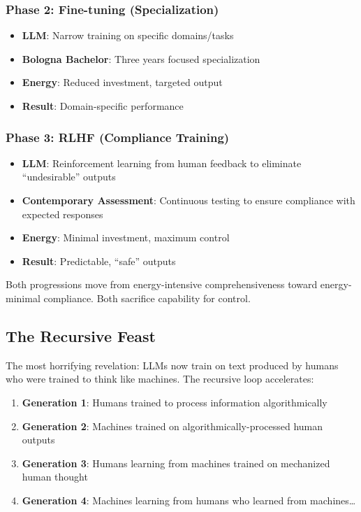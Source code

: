 \subsubsection{Phase 2: Fine-tuning (Specialization)}
\begin{itemize}
\item \textbf{LLM}: Narrow training on specific domains/tasks
\item \textbf{Bologna Bachelor}: Three years focused specialization
\item \textbf{Energy}: Reduced investment, targeted output
\item \textbf{Result}: Domain-specific performance
\end{itemize}

\subsubsection{Phase 3: RLHF (Compliance Training)}
\begin{itemize}
\item \textbf{LLM}: Reinforcement learning from human feedback to eliminate ``undesirable'' outputs
\item \textbf{Contemporary Assessment}: Continuous testing to ensure compliance with expected responses
\item \textbf{Energy}: Minimal investment, maximum control
\item \textbf{Result}: Predictable, ``safe'' outputs
\end{itemize}

Both progressions move from energy-intensive comprehensiveness toward energy-minimal compliance. Both sacrifice capability for control.

\subsection{The Recursive Feast}

The most horrifying revelation: LLMs now train on text produced by humans who were trained to think like machines. The recursive loop accelerates:

\begin{enumerate}
\item \textbf{Generation 1}: Humans trained to process information algorithmically
\item \textbf{Generation 2}: Machines trained on algorithmically-processed human outputs
\item \textbf{Generation 3}: Humans learning from machines trained on mechanized human thought
\item \textbf{Generation 4}: Machines learning from humans who learned from machines\ldots
\end{enumerate}

